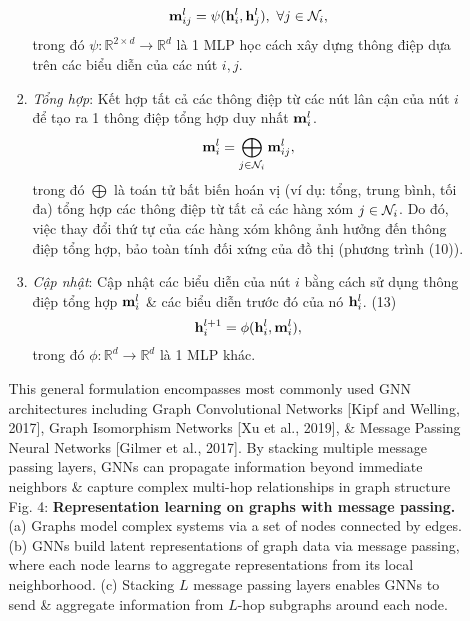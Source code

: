 \documentclass{article}
\begin{document}
\begin{itemize}
\begin{itemize}
\begin{enumerate}
            \begin{equation*}
                {\bf m}_{ij}^l = \psi({\bf h}_i^l,{\bf h}_j^l),\ \forall j\in{\cal N}_i,
            \end{equation*}
            trong đó $\psi:\mathbb{R}^{2\times d}\to\mathbb{R}^d$ là 1 MLP học cách xây dựng thông điệp dựa trên các biểu diễn của các nút $i,j$.
            \item {\it Tổng hợp}: Kết hợp tất cả các thông điệp từ các nút lân cận của nút $i$ để tạo ra 1 thông điệp tổng hợp duy nhất ${\bf m}_i^l$.
            \begin{equation*}
                {\bf m}_i^l = \bigoplus_{j\in{\cal N}_i} {\bf m}_{ij}^l,
            \end{equation*}
            trong đó $\bigoplus$ là toán tử bất biến hoán vị (ví dụ: tổng, trung bình, tối đa) tổng hợp các thông điệp từ tất cả các hàng xóm $j\in{\cal N}_i$. Do đó, việc thay đổi thứ tự của các hàng xóm không ảnh hưởng đến thông điệp tổng hợp, bảo toàn tính đối xứng của đồ thị (phương trình (10)).
            \item {\it Cập nhật}: Cập nhật các biểu diễn của nút $i$ bằng cách sử dụng thông điệp tổng hợp ${\bf m}_i^l$ \& các biểu diễn trước đó của nó ${\bf h}_i^l$. (13)
            \begin{equation*}
                {\bf h}_i^{l+1} = \phi({\bf h}_i^l,{\bf m}_i^l),
            \end{equation*}
            trong đó $\phi:\mathbb{R}^d\to\mathbb{R}^d$ là 1 MLP khác.
        \end{enumerate}
        This general formulation encompasses most commonly used GNN architectures including Graph Convolutional Networks [Kipf and Welling, 2017], Graph Isomorphism Networks [Xu et al., 2019], \& Message Passing Neural Networks [Gilmer et al., 2017]. By stacking multiple message passing layers, GNNs can propagate information beyond immediate neighbors \& capture complex multi-hop relationships in graph structure {\sf Fig. 4: {\bf Representation learning on graphs with message passing.} (a) Graphs model complex systems via a set of nodes connected by edges. (b) GNNs build latent representations of graph data via message passing, where each node learns to aggregate representations from its local neighborhood. (c) Stacking $L$ message passing layers enables GNNs to send \& aggregate information from $L$-hop subgraphs around each node.}
        

\end{itemize}
\end{itemize}
\end{document}
